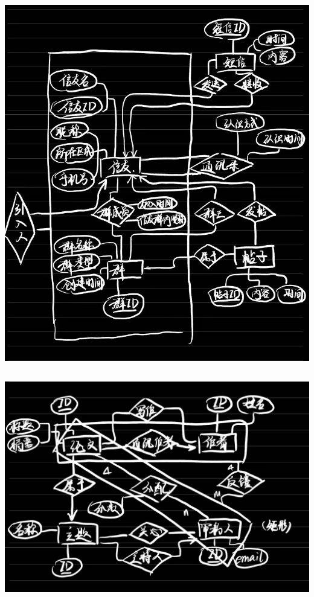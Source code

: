 \documentclass[UTF8]{ctexart}
\begin{document}
\includegraphics[width=\textwidth]{./pics/4.jpeg}

\subsection{}

\includegraphics[width=\textwidth]{./pics/5.jpeg}
\end{document}
